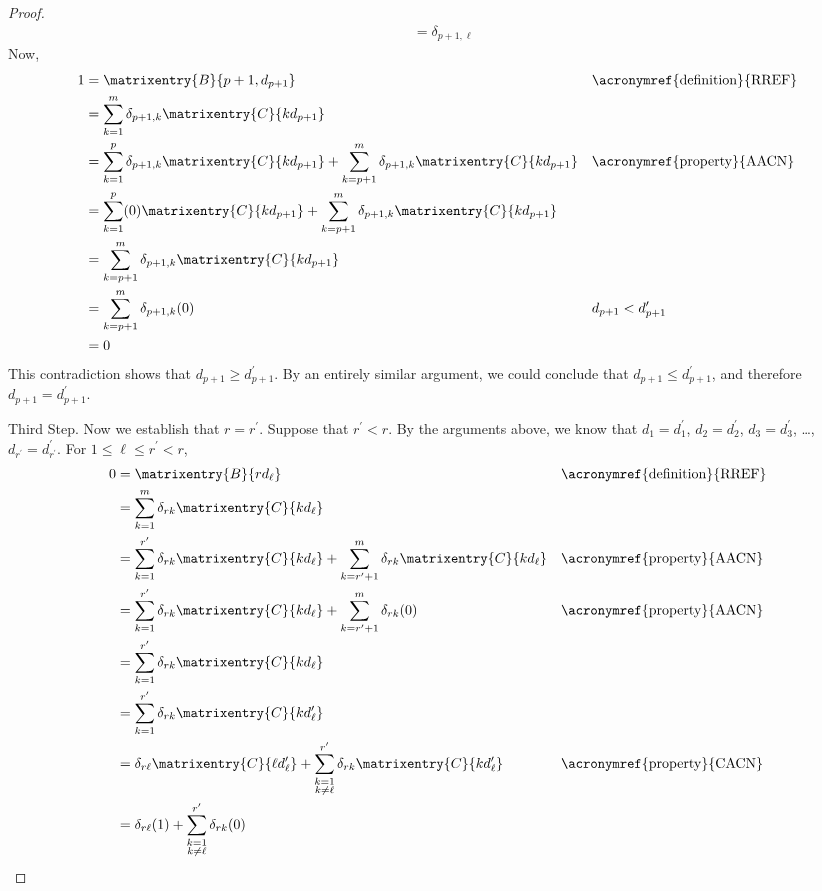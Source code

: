 \begin{proof}
\begin{align*}
%
&=\delta_{p+1,\ell}
%
\end{align*}
%
Now,
%
\begin{align*}
1
&=\matrixentry{B}{p+1,d_{p+1}}
&&\text{\acronymref{definition}{RREF}}\\
%
&=\sum_{k=1}^{m}\delta_{p+1,k}\matrixentry{C}{kd_{p+1}}\\
%
&=
\sum_{k=1}^{p}\delta_{p+1,k}\matrixentry{C}{kd_{p+1}}+
\sum_{k=p+1}^{m}\delta_{p+1,k}\matrixentry{C}{kd_{p+1}}
&&\text{\acronymref{property}{AACN}}\\
%
&=
\sum_{k=1}^{p}(0)\matrixentry{C}{kd_{p+1}}+
\sum_{k=p+1}^{m}\delta_{p+1,k}\matrixentry{C}{kd_{p+1}}\\
%
&=\sum_{k=p+1}^{m}\delta_{p+1,k}\matrixentry{C}{kd_{p+1}}\\
%
&=\sum_{k=p+1}^{m}\delta_{p+1,k}(0)
&&d_{p+1}<d^\prime_{p+1}\\
%
&=0
%
\end{align*}
%
This contradiction shows that 
$d_{p+1}\geq d^\prime_{p+1}$.  By an entirely similar argument, we could conclude that $d_{p+1}\leq d^\prime_{p+1}$, and therefore $d_{p+1}=d^\prime_{p+1}$.\par
%
Third Step.  Now we establish that $r=r^\prime$.  Suppose that $r^\prime<r$.  By the arguments above, we know that $d_1=d^\prime_1$, $d_2=d^\prime_2$, $d_3=d^\prime_3$, \dots, $d_{r^\prime}=d^\prime_{r^\prime}$.   For $1\leq\ell\leq r^\prime<r$,
%
\begin{align*}
0
&=\matrixentry{B}{rd_\ell}
&&\text{\acronymref{definition}{RREF}}\\
%
&=\sum_{k=1}^{m}\delta_{rk}\matrixentry{C}{kd_\ell}\\
%
&=
\sum_{k=1}^{r^\prime}\delta_{rk}\matrixentry{C}{kd_\ell}
+
\sum_{k=r^\prime+1}^{m}\delta_{rk}\matrixentry{C}{kd_\ell}
&&\text{\acronymref{property}{AACN}}\\%
%
&=
\sum_{k=1}^{r^\prime}\delta_{rk}\matrixentry{C}{kd_\ell}
+
\sum_{k=r^\prime+1}^{m}\delta_{rk}(0)
&&\text{\acronymref{property}{AACN}}\\
%
&=\sum_{k=1}^{r^\prime}\delta_{rk}\matrixentry{C}{kd_\ell}\\
%
&=\sum_{k=1}^{r^\prime}\delta_{rk}\matrixentry{C}{kd^\prime_\ell}\\
%
&=
\delta_{r\ell}\matrixentry{C}{\ell d^\prime_\ell}
+
\sum_{\substack{k=1\\k\neq\ell}}^{r^\prime}\delta_{rk}\matrixentry{C}{kd^\prime_\ell}
&&\text{\acronymref{property}{CACN}}\\
%
&=
\delta_{r\ell}(1)
+
\sum_{\substack{k=1\\k\neq\ell}}^{r^\prime}\delta_{rk}(0)

\end{align*}
\end{proof}

